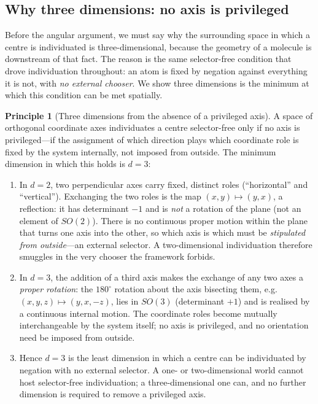 \documentclass[11pt,twocolumn,a4paper]{article}
\theoremstyle{thmstyle}
\theoremstyle{definition}
\newtheorem{principle}[theorem]{Principle}
\theoremstyle{remark}
\begin{document}
\subsection{Why three dimensions: no axis is privileged}

Before the angular argument, we must say why the surrounding space in
which a centre is individuated is three-dimensional, because the geometry
of a molecule is downstream of that fact. The reason is the same
selector-free condition that drove individuation throughout: an atom is
fixed by negation against everything it is not, with \emph{no external
chooser}. We show three dimensions is the minimum at which this condition
can be met spatially.

\begin{principle}[Three dimensions from the absence of a privileged axis]
\label{prin:threed}
A space of orthogonal coordinate axes individuates a centre
selector-free only if no axis is privileged---if the assignment of which
direction plays which coordinate role is fixed by the system internally,
not imposed from outside. The minimum dimension in which this holds is
$d=3$:
\begin{enumerate}[label=\textup{(\roman*)},leftmargin=2.2em]
\item In $d=2$, two perpendicular axes carry fixed, distinct roles
(``horizontal'' and ``vertical''). Exchanging the two roles is the map
$(x,y)\mapsto(y,x)$, a reflection: it has determinant $-1$ and is
\emph{not} a rotation of the plane (not an element of $SO(2)$). There is
no continuous proper motion within the plane that turns one axis into the
other, so which axis is which must be \emph{stipulated from outside}---an
external selector. A two-dimensional individuation therefore smuggles in
the very chooser the framework forbids.
\item In $d=3$, the addition of a third axis makes the exchange of any two
axes a \emph{proper rotation}: the $180^{\circ}$ rotation about the axis
bisecting them, e.g.\ $(x,y,z)\mapsto(y,x,-z)$, lies in $SO(3)$
(determinant $+1$) and is realised by a continuous internal motion. The
coordinate roles become mutually interchangeable by the system itself; no
axis is privileged, and no orientation need be imposed from outside.
\item Hence $d=3$ is the least dimension in which a centre can be
individuated by negation with no external selector. A one- or
two-dimensional world cannot host selector-free individuation; a
three-dimensional one can, and no further dimension is required to remove
a privileged axis.
\end{enumerate}
\end{principle}
\end{document}
